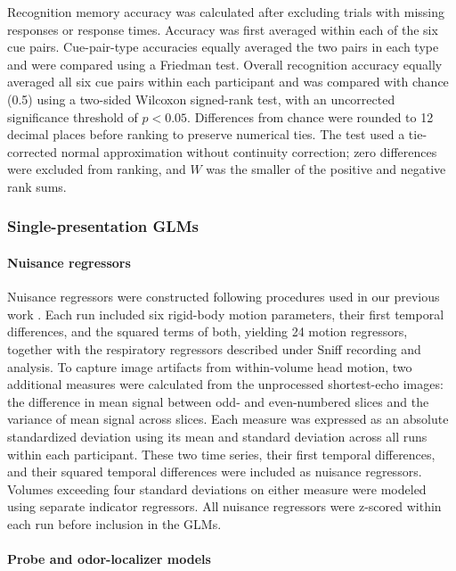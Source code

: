\documentclass[9pt,twoside,lineno]{pnas-new}
\begin{document}
Recognition memory accuracy was calculated after excluding trials with missing responses or response times. Accuracy was first averaged within each of the six cue pairs. Cue-pair-type accuracies equally averaged the two pairs in each type and were compared using a Friedman test. Overall recognition accuracy equally averaged all six cue pairs within each participant and was compared with chance (0.5) using a two-sided Wilcoxon signed-rank test, with an uncorrected significance threshold of $p < 0.05$. Differences from chance were rounded to 12 decimal places before ranking to preserve numerical ties. The test used a tie-corrected normal approximation without continuity correction; zero differences were excluded from ranking, and $W$ was the smaller of the positive and negative rank sums.

\subsubsection*{Single-presentation GLMs}

\paragraph*{Nuisance regressors}

Nuisance regressors were constructed following procedures used in our previous work \cite{liu2025distinct,liuyaoatt24}. Each run included six rigid-body motion parameters, their first temporal differences, and the squared terms of both, yielding 24 motion regressors, together with the respiratory regressors described under Sniff recording and analysis. To capture image artifacts from within-volume head motion, two additional measures were calculated from the unprocessed shortest-echo images: the difference in mean signal between odd- and even-numbered slices and the variance of mean signal across slices. Each measure was expressed as an absolute standardized deviation using its mean and standard deviation across all runs within each participant. These two time series, their first temporal differences, and their squared temporal differences were included as nuisance regressors. Volumes exceeding four standard deviations on either measure were modeled using separate indicator regressors. All nuisance regressors were z-scored within each run before inclusion in the GLMs.

\paragraph*{Probe and odor-localizer models}
\end{document}
